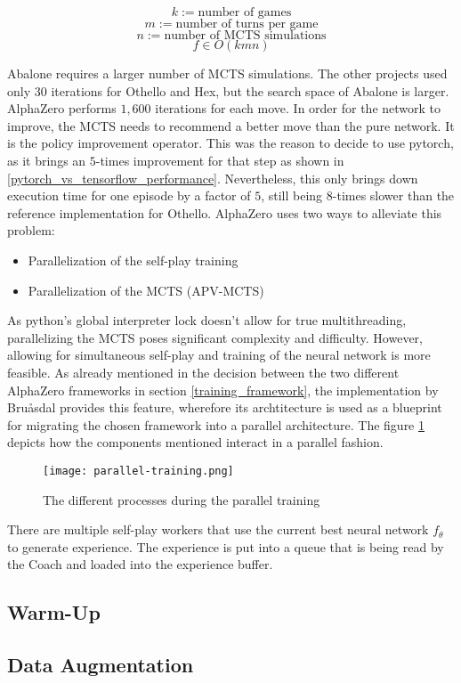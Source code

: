 $$
    k := \text{number of games}
$$
$$
    m := \text{number of turns per game}
$$
$$
    n := \text{number of MCTS simulations}
$$
$$
    f \in O(kmn)
$$

Abalone requires a larger number of MCTS simulations. The other projects \cite{bruasdal_deep_2020,thakoor_learning_nodate} used only 30 iterations for Othello and Hex, but the search space of Abalone is larger. AlphaZero performs $1,600$ iterations \cite[p. 11]{silver_mastering_2017} for each move. In order for the network to improve, the MCTS needs to recommend a better move than the pure network. It is the policy improvement operator. This was the reason to decide to use pytorch, as it brings an $5$-times improvement for that step as shown in \ref{pytorch_vs_tensorflow_performance}. Nevertheless, this only brings down execution time for one episode by a factor of $5$, still being $8$-times slower than the reference implementation for Othello. AlphaZero uses two ways to alleviate this problem:

\begin{itemize}
    \item Parallelization of the self-play training
    \item Parallelization of the MCTS (APV-MCTS)
\end{itemize}

As python's global interpreter lock \cite{noauthor_globalinterpreterlock_nodate} doesn't allow for true multithreading, parallelizing the MCTS poses significant complexity and difficulty. However, allowing for simultaneous self-play and training of the neural network is more feasible. As already mentioned in the decision between the two different AlphaZero frameworks in section \ref{training_framework}, the implementation by Bruåsdal \cite{bruasdal_deep_2020} provides this feature, wherefore its archtitecture is used as a blueprint for migrating the chosen framework into a parallel architecture. The figure \ref{parallel_training_pipeline} depicts how the components mentioned interact in a parallel fashion.

\begin{figure}
    \centering
    \texttt{[image: parallel-training.png]}
    \caption{The different processes during the parallel training}
    \label{parallel_training_pipeline}
\end{figure}

There are multiple self-play workers that use the current best neural network $f_{\theta}$ to generate experience. The experience is put into a queue that is being read by the Coach and loaded into the experience buffer.

\subsection{Warm-Up}

\subsection{Data Augmentation}